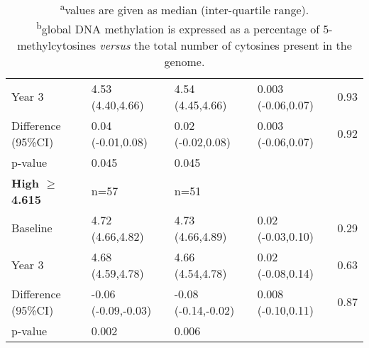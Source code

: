 \begin{table}
\begin{tabular}{L{2.6cm}C{2.5cm}C{2.4cm}C{2.7cm}C{1cm}}
 Year 3 & 4.53 (4.40,4.66) & 4.54 (4.45,4.66) & 0.003 (-0.06,0.07) & 0.93\\
 Difference (95\%CI) & 0.04 (-0.01,0.08) & 0.02 (-0.02,0.08) & 0.003 (-0.06,0.07) & 0.92\\
 p-value & 0.045 & 0.045 & ~ & ~ \\
\bfseries High ${\geq}$ 4.615 & n=57 & n=51 & ~ & ~ \\
 Baseline & 4.72 (4.66,4.82) & 4.73 (4.66,4.89) & 0.02 (-0.03,0.10) & 0.29\\
 Year 3 & 4.68 (4.59,4.78) & 4.66 (4.54,4.78) & 0.02 (-0.08,0.14) & 0.63\\
 Difference (95\%CI) & {}-0.06 (-0.09,-0.03) & {}-0.08 (-0.14,-0.02) & 0.008 (-0.10,0.11) & 0.87\\
 p-value & 0.002 & 0.006 & ~ & ~ \\
\hline
\end{tabular}
\caption*{\footnotesize{\textsuperscript{a}values are given as median (inter-quartile range).\\\textsuperscript{b}global DNA methylation is expressed as a percentage of 5-methylcytosines \emph{versus} the total number of cytosines present in the genome.}}
\end{table}

